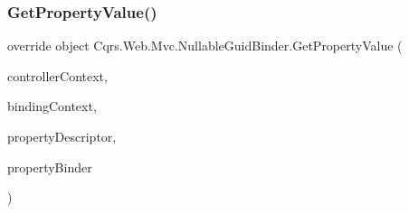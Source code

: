\subsubsection{\texorpdfstring{Get\+Property\+Value()}{GetPropertyValue()}}
{\footnotesize\ttfamily override object Cqrs.\+Web.\+Mvc.\+Nullable\+Guid\+Binder.\+Get\+Property\+Value (\begin{DoxyParamCaption}\item[{Controller\+Context}]{controller\+Context,  }\item[{Model\+Binding\+Context}]{binding\+Context,  }\item[{Property\+Descriptor}]{property\+Descriptor,  }\item[{I\+Model\+Binder}]{property\+Binder }\end{DoxyParamCaption})\hspace{0.3cm}{\ttfamily [protected]}}

